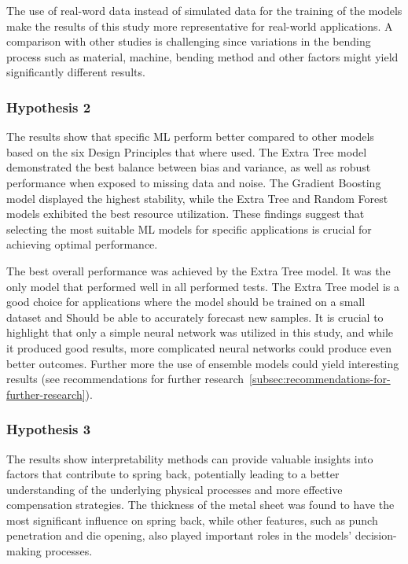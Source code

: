 The use of real-word data instead of simulated data for the training of the models make the results of this study more
representative for real-world applications.
A comparison with other studies is challenging since variations in the bending process such as material, machine,
bending method and other factors might yield significantly different results.

\subsubsection{Hypothesis 2}

The results show that specific \ac{ML} perform better compared to other models based on the six Design Principles
that where used.
The Extra Tree model demonstrated the best balance between bias and variance, as well as robust performance when
exposed to missing data and noise.
The Gradient Boosting model displayed the highest stability, while the Extra Tree and Random Forest models exhibited
the best resource utilization.
These findings suggest that selecting the most suitable ML models for specific applications is crucial for achieving
optimal performance.

The best overall performance was achieved by the Extra Tree model.
It was the only model that performed well in all performed tests.
The Extra Tree model is a good choice for applications where the model should be trained on a small dataset and
Should be able to accurately forecast new samples.
It is crucial to highlight that only a simple neural network was utilized in this study, and while it produced good
results, more complicated neural networks could produce even better outcomes.
Further more the use of ensemble models could yield interesting results (see recommendations for further
research~\ref{subsec:recommendations-for-further-research}).

\subsubsection{Hypothesis 3}
The results show interpretability methods can provide valuable insights into factors that contribute to spring back,
potentially leading to a better understanding of the underlying physical processes and more effective compensation
strategies.
The thickness of the metal sheet was found to have the most significant influence on spring back, while other
features, such as punch penetration and die opening, also played important roles in the models' decision-making
processes.

